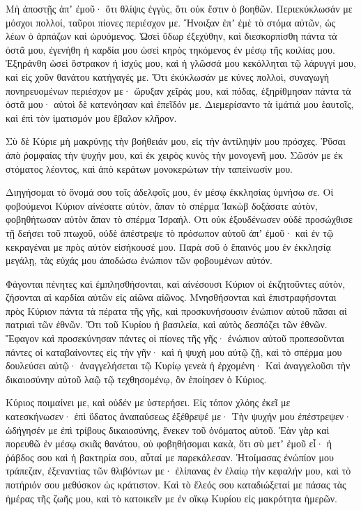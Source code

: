 \begin{spacing}{1.1}
\begin{multicols}{2}
Μὴ ἀποστῇς ἀπʼ ἐμοῦ· ὅτι θλίψις ἐγγὺς, ὅτι οὐκ ἔστιν ὁ βοηθῶν.
Περιεκύκλωσάν με μόσχοι πολλοί, ταῦροι πίονες περιέσχον με.
Ἤνοιξαν ἐπʼ ἐμὲ τὸ στόμα αὐτῶν, ὡς λέων ὁ ἁρπάζων καὶ ὠρυόμενος.
Ὡσεὶ ὕδωρ ἐξεχύθην, καὶ διεσκορπίσθη πάντα τὰ ὀστᾶ μου, ἐγενήθη ἡ καρδία μου ὡσεὶ κηρὸς τηκόμενος ἐν μέσῳ τῆς κοιλίας μου.
Ἐξηράνθη ὡσεὶ ὄστρακον ἡ ἰσχύς μου, καὶ ἡ γλῶσσά μου κεκόλληται τῷ λάρυγγί μου, καὶ εἰς χοῦν θανάτου κατήγαγές με.
Ὅτι ἐκύκλωσάν με κύνες πολλοὶ, συναγωγὴ πονηρευομένων περιέσχον με· ὤρυξαν χεῖράς μου, καὶ πόδας,
ἐξηρίθμησαν πάντα τὰ ὀστᾶ μου· αὐτοὶ δὲ κατενόησαν καὶ ἐπεῖδόν με.
Διεμερίσαντο τὰ ἱμάτιά μου ἑαυτοῖς, καὶ ἐπὶ τὸν ἱματισμόν μου ἔβαλον κλῆρον.

Σὺ δὲ Κύριε μὴ μακρύνῃς τὴν βοήθειάν μου, εἰς τὴν ἀντίληψίν μου πρόσχες.
Ῥῦσαι ἀπὸ ῥομφαίας τὴν ψυχήν μου, καὶ ἐκ χειρὸς κυνὸς τὴν μονογενῆ μου.
Σῶσόν με ἐκ στόματος λέοντος, καὶ ἀπὸ κεράτων μονοκερώτων τὴν ταπείνωσίν μου.

Διηγήσομαι τὸ ὄνομά σου τοῖς ἀδελφοῖς μου, ἐν μέσῳ ἐκκλησίας ὑμνήσω σε.
Οἱ φοβούμενοι Κύριον αἰνέσατε αὐτὸν, ἅπαν τὸ σπέρμα Ἰακὼβ δοξάσατε αὐτὸν, φοβηθήτωσαν αὐτὸν ἅπαν τὸ σπέρμα Ἰσραήλ.
Οτι οὐκ ἐξουδένωσεν οὐδὲ προσώχθισε τῇ δεήσει τοῦ πτωχοῦ, οὐδὲ ἀπέστρεψε τὸ πρόσωπον αὐτοῦ ἀπʼ ἐμοῦ· καὶ ἐν τῷ κεκραγέναι με πρὸς αὐτὸν εἰσήκουσέ μου.
Παρὰ σοῦ ὁ ἔπαινός μου ἐν ἐκκλησίᾳ μεγάλῃ, τὰς εὐχάς μου ἀποδώσω ἐνώπιον τῶν φοβουμένων αὐτόν.

Φάγονται πένητες καὶ ἐμπλησθήσονται, καὶ αἰνέσουσι Κύριον οἱ ἐκζητοῦντες αὐτὸν, ζήσονται αἱ καρδίαι αὐτῶν εἰς αἰῶνα αἰῶνος.
Μνησθήσονται καὶ ἐπιστραφήσονται πρὸς Κύριον πάντα τὰ πέρατα τῆς γῆς, καὶ προσκυνήσουσιν ἐνώπιον αὐτοῦ πᾶσαι αἱ πατριαὶ τῶν ἐθνῶν.
Ὅτι τοῦ Κυρίου ἡ βασιλεία, καὶ αὐτὸς δεσπόζει τῶν ἐθνῶν.
Ἔφαγον καὶ προσεκύνησαν πάντες οἱ πίονες τῆς γῆς· ἐνώπιον αὐτοῦ προπεσοῦνται πάντες οἱ καταβαίνοντες εἰς τὴν γῆν· καὶ ἡ ψυχή μου αὐτῷ ζῇ,
καὶ τὸ σπέρμα μου δουλεύσει αὐτῷ· ἀναγγελήσεται τῷ Κυρίῳ γενεὰ ἡ ἐρχομένη·
Καὶ ἀναγγελοῦσι τὴν δικαιοσύνην αὐτοῦ λαῷ τῷ τεχθησομένῳ, ὃν ἐποίησεν ὁ Κύριος.

Κύριος ποιμαίνει με, καὶ οὐδέν με ὑστερήσει.
Εἰς τόπον χλόης ἐκεῖ με κατεσκήνωσεν· ἐπὶ ὕδατος ἀναπαύσεως ἐξέθρεψέ με·
Τὴν ψυχήν μου ἐπέστρεψεν· ὡδήγησέν με ἐπὶ τρίβους δικαιοσύνης, ἕνεκεν τοῦ ὀνόματος αὐτοῦ.
Ἐὰν γὰρ καὶ πορευθῶ ἐν μέσῳ σκιᾶς θανάτου, οὐ φοβηθήσομαι κακὰ, ὅτι σὺ μετʼ ἐμοῦ εἶ· ἡ ῥάβδος σου καὶ ἡ βακτηρία σου, αὗταί με παρεκάλεσαν.
Ἡτοίμασας ἐνώπίον μου τράπεζαν, ἐξεναντίας τῶν θλιβόντων με· ἐλίπανας ἐν ἐλαίῳ τὴν κεφαλήν μου, καὶ τὸ ποτήριόν σου μεθύσκον ὡς κράτιστον.
Καὶ τὸ ἔλεός σου καταδιώξεταί με πάσας τὰς ἡμέρας τῆς ζωῆς μου, καὶ τὸ κατοικεῖν με ἐν οἴκῳ Κυρίου εἰς μακρότητα ἡμερῶν.


\end{multicols}
\end{spacing}

